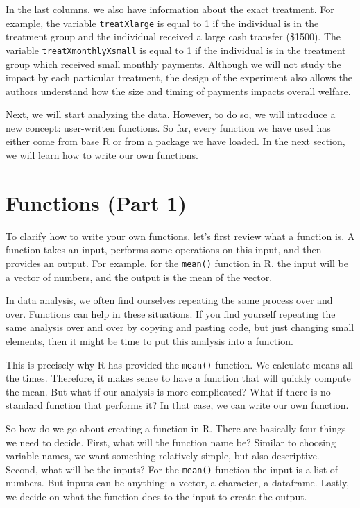 \documentclass[
]{book}
\begin{document}
In the last columns, we also have information about the exact treatment. For example, the variable \texttt{treatXlarge} is equal to 1 if the individual is in the treatment group and the individual received a large cash transfer (\$1500). The variable \texttt{treatXmonthlyXsmall} is equal to 1 if the individual is in the treatment group which received small monthly payments. Although we will not study the impact by each particular treatment, the design of the experiment also allows the authors understand how the size and timing of payments impacts overall welfare.

Next, we will start analyzing the data. However, to do so, we will introduce a new concept: user-written functions. So far, every function we have used has either come from base R or from a package we have loaded. In the next section, we will learn how to write our own functions.

\section{Functions (Part 1)}\label{functions-part-1}

To clarify how to write your own functions, let's first review what a function is. A function takes an input, performs some operations on this input, and then provides an output. For example, for the \texttt{mean()} function in R, the input will be a vector of numbers, and the output is the mean of the vector.

In data analysis, we often find ourselves repeating the same process over and over. Functions can help in these situations. If you find yourself repeating the same analysis over and over by copying and pasting code, but just changing small elements, then it might be time to put this analysis into a function.

This is precisely why R has provided the \texttt{mean()} function. We calculate means all the times. Therefore, it makes sense to have a function that will quickly compute the mean. But what if our analysis is more complicated? What if there is no standard function that performs it? In that case, we can write our own function.

So how do we go about creating a function in R. There are basically four things we need to decide. First, what will the function name be? Similar to choosing variable names, we want something relatively simple, but also descriptive. Second, what will be the inputs? For the \texttt{mean()} function the input is a list of numbers. But inputs can be anything: a vector, a character, a dataframe. Lastly, we decide on what the function does to the input to create the output.
\end{document}
